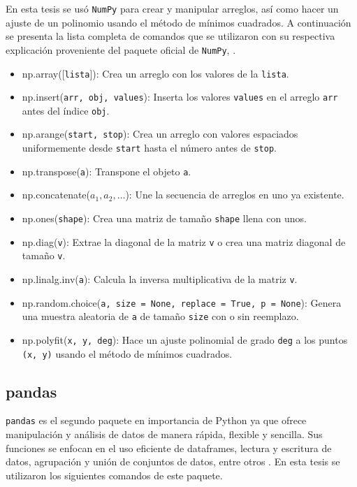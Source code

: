 En esta tesis se usó \texttt{NumPy} para crear y manipular arreglos, así como hacer un ajuste de un polinomio usando el método de mínimos cuadrados. A continuación se presenta la lista completa de comandos que se utilizaron con su respectiva explicación proveniente del paquete oficial de \texttt{NumPy}, \cite{numpy_manual}. 

\begin{itemize}
	\item np.array([\texttt{lista}]): Crea un arreglo con los valores de la \texttt{lista}.
	
	\item np.insert(\texttt{arr, obj, values}): Inserta los valores \texttt{values} en el arreglo \texttt{arr} antes del índice \texttt{obj}.
	
	\item np.arange(\texttt{start, stop}): Crea un arreglo con valores espaciados uniformemente desde \texttt{start} hasta el número antes de \texttt{stop}. 
	
	\item np.transpose(\texttt{a}): Transpone el objeto \texttt{a}.
	
	\item np.concatenate(\texttt{$a_1, a_2, \dots $}): Une la secuencia de arreglos en uno ya existente.
	
	\item np.ones(\texttt{shape}): Crea una matriz de tamaño \texttt{shape} llena con unos.
	
	\item np.diag(\texttt{v}): Extrae la diagonal de la matriz \texttt{v} o crea una matriz diagonal de tamaño \texttt{v}.
	
	\item np.linalg.inv(\texttt{a}): Calcula la inversa multiplicativa de la matriz \texttt{v}. 
	
	\item np.random.choice(\texttt{a, size = None, replace = True, p = None}): Genera una muestra aleatoria de \texttt{a} de tamaño \texttt{size} con o sin reemplazo. 
	
	\item np.polyfit(\texttt{x, y, deg}): Hace un ajuste polinomial de grado \texttt{deg} a los puntos \texttt{(x, y)} usando el método de mínimos cuadrados. 
	
\end{itemize}


\subsection{pandas}
\texttt{pandas} es el segundo paquete en importancia de \textsf{Python} ya que ofrece manipulación y análisis de datos de manera rápida, flexible y sencilla. Sus funciones se enfocan en el uso eficiente de dataframes, lectura y escritura de datos, agrupación y unión de conjuntos de datos, entre otros \citep{pandas_manual}. En esta tesis se utilizaron los siguientes comandos de este paquete.

